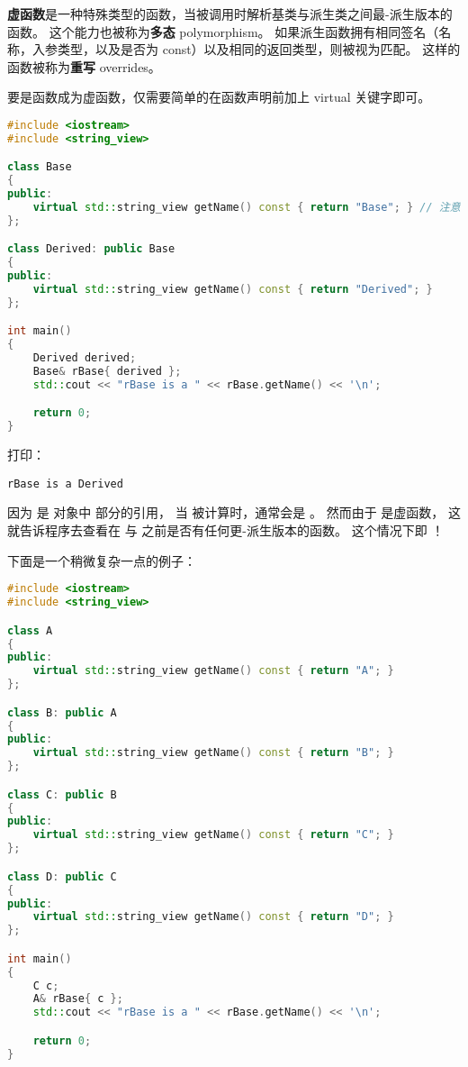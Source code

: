 \documentclass[../../LearnCpp.tex]{subfiles}
\begin{document}

\textbf{虚函数}是一种特殊类型的函数，当被调用时解析基类与派生类之间最-派生版本的函数。
这个能力也被称为\textbf{多态} polymorphism。
如果派生函数拥有相同签名（名称，入参类型，以及是否为 const）以及相同的返回类型，则被视为匹配。
这样的函数被称为\textbf{重写} overrides。

要是函数成为虚函数，仅需要简单的在函数声明前加上 virtual 关键字即可。

\begin{lstlisting}[language=C++]
#include <iostream>
#include <string_view>

class Base
{
public:
    virtual std::string_view getName() const { return "Base"; } // 注意额外的 virtual 关键字
};

class Derived: public Base
{
public:
    virtual std::string_view getName() const { return "Derived"; }
};

int main()
{
    Derived derived;
    Base& rBase{ derived };
    std::cout << "rBase is a " << rBase.getName() << '\n';

    return 0;
}
\end{lstlisting}

打印：

\begin{lstlisting}
rBase is a Derived
\end{lstlisting}

因为  是  对象中  部分的引用，
当  被计算时，通常会是 。
然而由于  是虚函数，
这就告诉程序去查看在  与  之前是否有任何更-派生版本的函数。
这个情况下即 ！

下面是一个稍微复杂一点的例子：

\begin{lstlisting}[language=C++]
#include <iostream>
#include <string_view>

class A
{
public:
    virtual std::string_view getName() const { return "A"; }
};

class B: public A
{
public:
    virtual std::string_view getName() const { return "B"; }
};

class C: public B
{
public:
    virtual std::string_view getName() const { return "C"; }
};

class D: public C
{
public:
    virtual std::string_view getName() const { return "D"; }
};

int main()
{
    C c;
    A& rBase{ c };
    std::cout << "rBase is a " << rBase.getName() << '\n';

    return 0;
}
\end{lstlisting}
\end{document}
